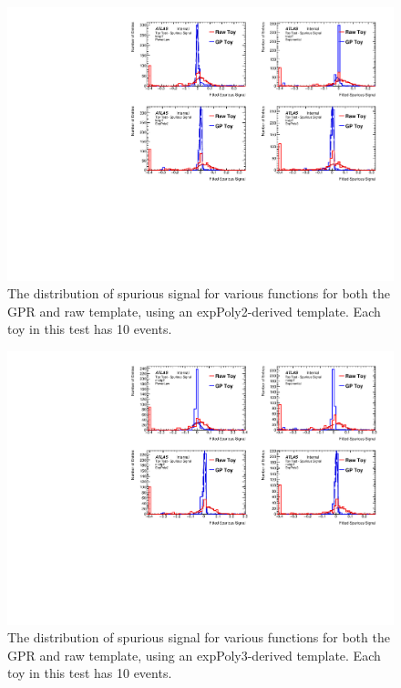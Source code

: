 \begin{figure} 
\begin{center}
  \includegraphics[width=\textwidth]{figures/background/gpr/validation/nominal/ToyTest_FitSigVals_lowpT_10_noSig}   
\caption{The distribution of spurious signal for various functions for both the GPR and raw template, using an expPoly2-derived template. Each toy in this test has 10 events.}
\label{fig:lowpt_10_noSig}
\end{center}
\end{figure}

\begin{figure} 
\begin{center}
  \includegraphics[width=\textwidth]{figures/background/gpr/validation/nominal/ToyTest_FitSigVals_medpT_10_noSig}   
\caption{The distribution of spurious signal for various functions for both the GPR and raw template, using an expPoly3-derived template. Each toy in this test has 10 events.}
\label{fig:medpt_10_noSig}
\end{center}
\end{figure}

